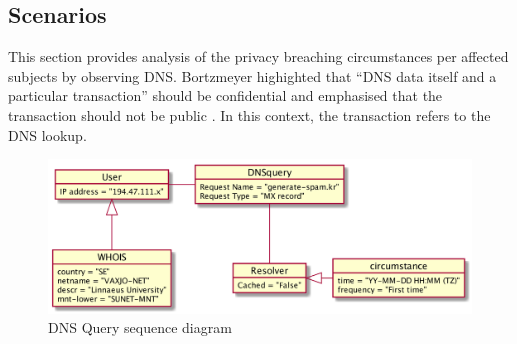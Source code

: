 \subsection{Scenarios}
This section provides analysis of the privacy breaching circumstances per affected subjects by observing DNS.
Bortzmeyer highighted that ``DNS data itself and a particular transaction'' should be confidential and emphasised that the transaction should not be public \cite{rfc7626}. In this context, the transaction refers to the DNS lookup.
\begin{figure}[ht!]
    \begin{center}
        \includegraphics*[width=\columnwidth]{img/privacyobject}
    \end{center}
    \caption{DNS Query sequence diagram}
    \label{privacyobject}
\end{figure}